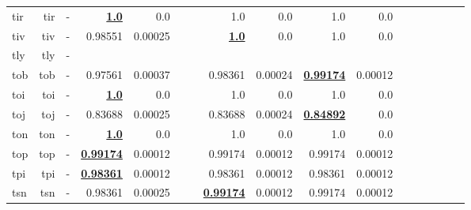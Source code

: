 \documentclass[11pt]{article}
\begin{document}
\begin{table*}[h]
{\begin{tabular}{lrrrrrrrrrrrrrrrr}
tir         & tir         & -         & \textbf{\underline{1.0}}         & 0.0         &          &          & 1.0         & 0.0         & 1.0         & 0.0         &          &          &          &          \\
tiv         & tiv         & -         & 0.98551         & 0.00025         &          &          & \textbf{\underline{1.0}}         & 0.0         & 1.0         & 0.0         &          &          &          &          \\
tly         & tly         & -         &          &          &          &          &          &          &          &          &          &          &          &          \\
tob         & tob         & -         & 0.97561         & 0.00037         &          &          & 0.98361         & 0.00024         & \textbf{\underline{0.99174}}         & 0.00012         &          &          &          &          \\
toi         & toi         & -         & \textbf{\underline{1.0}}         & 0.0         &          &          & 1.0         & 0.0         & 1.0         & 0.0         &          &          &          &          \\
toj         & toj         & -         & 0.83688         & 0.00025         &          &          & 0.83688         & 0.00024         & \textbf{\underline{0.84892}}         & 0.0         &          &          &          &          \\
ton         & ton         & -         & \textbf{\underline{1.0}}         & 0.0         &          &          & 1.0         & 0.0         & 1.0         & 0.0         &          &          &          &          \\
top         & top         & -         & \textbf{\underline{0.99174}}         & 0.00012         &          &          & 0.99174         & 0.00012         & 0.99174         & 0.00012         &          &          &          &          \\
tpi         & tpi         & -         & \textbf{\underline{0.98361}}         & 0.00012         &          &          & 0.98361         & 0.00012         & 0.98361         & 0.00012         &          &          &          &          \\
tsn         & tsn         & -         & 0.98361         & 0.00025         &          &          & \textbf{\underline{0.99174}}         & 0.00012         & 0.99174         & 0.00012         &          &          &          &          \\

\end{tabular}}
\end{table*}
\end{document}
